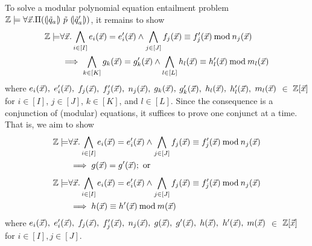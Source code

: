 
To solve a modular polynomial equation entailment problem $\mathbb{Z} \models \forall \vec{x}. \Pi ({(\!|}{\tilde{q}_a}{|\!)}~{\tilde{p}}~{(\!|}{\tilde{q}_a'}{|\!)})$, it remains to show
\begin{equation*}
\begin{aligned}
  \bbfZ \models & \forall \vx. %
  \bigwedge\limits_{i \in [I]} e_i (\vx) = e'_i (\vx) \wedge
  \bigwedge\limits_{j \in [J]} f_j (\vx) \equiv f'_j (\vx) \mod n_j(\vx) \\
  & \implies
  \bigwedge\limits_{k \in [K]} g_k (\vx) = g'_k (\vx) \wedge
  \bigwedge\limits_{l \in [L]} h_l (\vx) \equiv h'_l (\vx) \mod m_l(\vx)
\end{aligned}
\end{equation*}
where
$e_i (\vec{x}),$ $e'_i (\vec{x}),$ $f_j (\vec{x}),$ $f'_j (\vec{x}),$ $n_j(\vec{x}),$
$g_k (\vec{x}),$ $g'_k (\vec{x}),$ $h_l (\vec{x}),$ $h'_l (\vec{x}),$ $m_l(\vec{x})$ $\in$
 $\mathbb{Z}[\vec{x}]$ for $i \in [I]$, $j \in [J]$, $k
 \in [K]$, and $l \in [L]$. Since the
consequence is a conjunction of (modular) equations, it suffices to
prove one conjunct at a time. That is, we aim to show
\begin{equation*}
\begin{aligned}
  \label{eq:polynomial-equation-implicant}
  \bbfZ \models & \forall \vx. %
  \bigwedge\limits_{i \in [I]} e_i (\vx) = e'_i (\vx) \wedge
  \bigwedge\limits_{j \in [J]} f_j (\vx) \equiv f'_j (\vx) \mod n_j (\vx) \\
  & \implies
  g (\vx) = g' (\vx); \textmd{ or}
\end{aligned}
\end{equation*}
\begin{equation*}
\begin{aligned}
   \label{eq:modular-polynomial-equation-implicant}
   \bbfZ \models & \forall \vx. %
   \bigwedge\limits_{i \in [I]} e_i (\vx) = e'_i (\vx) \wedge
   \bigwedge\limits_{j \in [J]} f_j (\vx) \equiv f'_j (\vx) \mod n_j (\vx) \\
   & \implies
   h (\vx) \equiv h' (\vx) \mod m (\vx)
\end{aligned}
\end{equation*}
where $e_i (\vec{x}),$ $e'_i (\vec{x}),$ $f_j (\vec{x}),$ $f'_j (\vec{x}),$ $n_j (\vec{x}),$ $g (\vec{x}),$ $g' (\vec{x}),$
$h (\vec{x}),$ $h' (\vec{x}),$ $m(\vec{x})$ $\in$ $\mathbb{Z}[\vec{x}]$ for $i \in [I], j \in [J]$.

